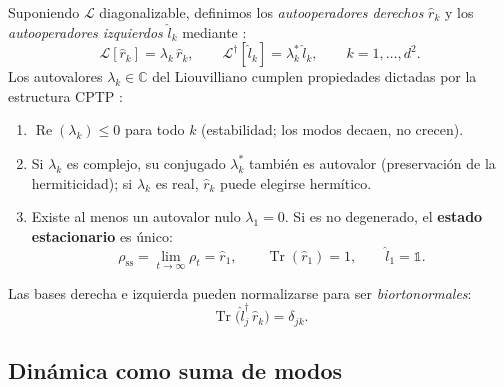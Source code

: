 \documentclass[11pt,a4paper]{article}
\theoremstyle{definition}
\theoremstyle{plain}
\newcommand{\Lop}{\mathcal{L}}
\newcommand{\Ldual}{\mathcal{L}^{\dagger}}
\newcommand{\rss}{\rho_{\mathrm{ss}}}
\renewcommand{\Tr}{\operatorname{Tr}}
\begin{document}
Suponiendo $\Lop$ diagonalizable, definimos los \emph{autooperadores derechos} $\hat r_k$ y los
\emph{autooperadores izquierdos} $\hat l_k$ mediante \cite{Carollo2021,LiYang2026}:
\begin{equation}
\Lop[\hat r_k]=\lambda_k\,\hat r_k,
\qquad
\Ldual[\hat l_k]=\lambda_k^{*}\,\hat l_k,
\qquad k=1,\dots,d^2 .
\label{eq:eig}
\end{equation}
Los autovalores $\lambda_k\in\mathbb{C}$ del Liouvilliano cumplen propiedades dictadas por la estructura
CPTP \cite{Carollo2021,Minganti2018}:
\begin{enumerate}[leftmargin=1.6em,itemsep=2pt]
\item $\operatorname{Re}(\lambda_k)\le 0$ para todo $k$ (estabilidad; los modos decaen, no crecen).
\item Si $\lambda_k$ es complejo, su conjugado $\lambda_k^{*}$ también es autovalor (preservación de la
hermiticidad); si $\lambda_k$ es real, $\hat r_k$ puede elegirse hermítico.
\item Existe al menos un autovalor nulo $\lambda_1=0$. Si es no degenerado, el \textbf{estado
estacionario} es único:
\begin{equation}
\rss=\lim_{t\to\infty}\rho_t=\hat r_1,\qquad \Tr(\hat r_1)=1,\qquad \hat l_1=\mathbb{1}.
\end{equation}
\end{enumerate}
Las bases derecha e izquierda pueden normalizarse para ser \emph{biortonormales}:
\begin{equation}
\Tr\!\big(\hat l_j^{\dagger}\,\hat r_k\big)=\delta_{jk}.
\label{eq:biorth}
\end{equation}

\subsection{Dinámica como suma de modos}
\end{document}
